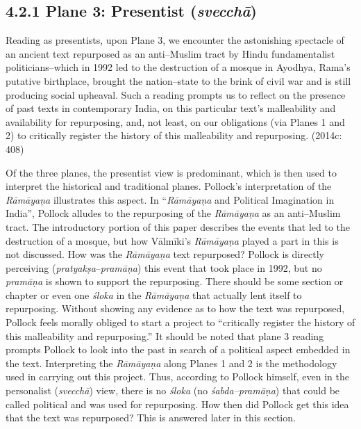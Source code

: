 \subsection*{4.2.1 Plane 3: Presentist ({\it {\bfseries svecchā}})}

\begin{myquote}
Reading as presentists, upon Plane 3, we encounter the astonishing spectacle of an ancient text repurposed as an anti–Muslim tract by Hindu fundamentalist politicians–which in 1992 led to the destruction of a mosque in Ayodhya, Rama’s putative birthplace, brought the nation–state to the brink of civil war and is still producing social upheaval. Such a reading prompts us to reflect on the presence of past texts in contemporary India, on this particular text’s malleability and availability for repurposing, and, not least, on our obligations (via Planes 1 and 2) to critically register the history of this malleability and repurposing. (2014c: 408)
\end{myquote}

Of the three planes, the presentist view is predominant, which is then used to interpret the historical and traditional planes. Pollock’s interpretation of the \textit{Rāmāyaṇa }illustrates this aspect. In “\textit{Rāmāyaṇa }and Political Imagination in India”, Pollock alludes to the repurposing of the \textit{Rāmāyaṇa }as an anti–Muslim tract. The introductory portion of this paper describes the events that led to the destruction of a mosque, but how Vālmīki’s\textit{ Rāmāyaṇa }played a part in this is not discussed. How was the \textit{Rāmāyaṇa }text repurposed? Pollock is directly perceiving (\textit{pratyakṣa}–\textit{pramāṇa}) this event that took place in 1992, but no \textit{pramāṇa} is shown to support the repurposing. There should be some section or chapter or even one \textit{śloka} in the \textit{Rāmāyaṇa }that actually lent itself to repurposing. Without showing any evidence as to how the text was repurposed, Pollock feels morally obliged to start a project to “critically register the history of this malleability and repurposing.” It should be noted that plane 3 reading prompts Pollock to look into the past in search of a political aspect embedded in the text. Interpreting the \textit{Rāmāyaṇa} along Planes 1 and 2 is the methodology used in carrying out this project. Thus, according to Pollock himself, even in the personalist (\textit{svecchā}) view, there is no \textit{śloka} (no \textit{śabda–pramāṇa}) that could be called political and was used for repurposing. How then did Pollock get this idea that the text was repurposed? This is answered later in this section.

